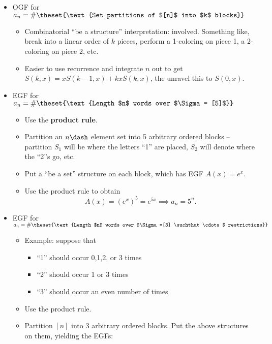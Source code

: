 \begin{itemize}
\tightlist
\item
  OGF for
  \(a_n = \#\theset{\text{Set partitions of $[n]$ into $k$ blocks}}\)

  \begin{itemize}
  \tightlist
  \item
    Combinatorial ``be a structure'' interpretation: involved. Something
    like, break into a linear order of \(k\) pieces, perform a
    1-coloring on piece 1, a 2-coloring on piece 2, etc.
  \item
    Easier to use recurrence and integrate \(n\) out to get
    \(S(k, x) = xS(k-1, x) + kxS(k, x)\), the unravel this to
    \(S(0, x)\).
  \end{itemize}
\item
  EGF for
  \(a_n = \#\theset{\text{Length $n$ words over $\Sigma = [5]$}}\)

  \begin{itemize}
  \tightlist
  \item
    Use the \textbf{product rule}.
  \item
    Partition an \(n\dash\) element set into 5 arbitrary ordered blocks
    -- partition \(S_1\) will be where the letters ``1'' are placed,
    \(S_2\) will denote where the ``2''s go, etc.
  \item
    Put a ``be a set'' structure on each block, which has EGF
    \(A(x) = e^x\).
  \item
    Use the product rule to obtain \[
    A(x) = (e^x)^5 = e^{5x} \implies a_n = 5^n.
    \]
  \end{itemize}
\item
  EGF for
  \(a_n = \#\theset{\text{Length $n$ words over $\Sigma =[3] \suchthat \cdots$ restrictions}}\)

  \begin{itemize}
  \item
    Example: suppose that

    \begin{itemize}
    \tightlist
    \item
      ``1'' should occur 0,1,2, or 3 times
    \item
      ``2'' should occur 1 or 3 times
    \item
      ``3'' should occur an even number of times
    \end{itemize}
  \item
    Use the product rule.
  \item
    Partition \([n]\) into 3 arbitrary ordered blocks. Put the above
    structures on them, yielding the EGFs:


\end{itemize}
\end{itemize}
